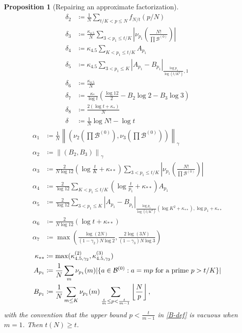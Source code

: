 \documentclass[12pt,a4paper,reqno]{amsart}
\numberwithin{equation}{section}
\theoremstyle{plain}
\newtheorem{proposition}[theorem]{Proposition}
\theoremstyle{definition}
\newcommand\tuple{{\mathcal B}}
\begin{document}
\begin{proposition}[Repairing an approximate factorization]
\begin{align}
\delta_2 &\coloneqq \frac{1}{N} \sum_{t/K < p \leq N} f_{N/t}(p/N) \label{delta2-def}  \\
\delta_3 &\coloneqq \frac{\kappa_{4.5}}{N}  \sum_{3 < p_1 \leq t/K} \left|\nu_{p_1}\left( \frac{N!}{\prod \tuple^{(0)}} \right)\right| \label{delta3-def}  \\
\delta_4 &\coloneqq \kappa_{4.5} \sum_{K < p_1 \leq t/K} A_{p_1} \label{delta4-def}  \\
\delta_5 &\coloneqq \kappa_{4.5} \sum_{3 < p_1 \leq K} |A_{p_1} - B_{p_1}|_{\frac{\log p_1}{\log(t/K^2)},1} \label{delta5-def}  \\
\delta_6 &\coloneqq \frac{\kappa_{4.5}}{N} \label{delta6-def}  \\
\delta_7 &\coloneqq \frac{\kappa_*}{\log t} \left( \frac{\log 12}{2} - B_2 \log 2 - B_3 \log 3\right)\label{delta7-def}  \\
\delta_8 &\coloneqq \frac{2(\log t + \kappa_*)}{N} \label{delta8-def}\\
\delta &\coloneqq \frac{1}{N} \log N! - \log t\label{delta-def}  
\end{align}
\begin{align}
\alpha_1 &\coloneqq \frac{1}{N} \left\| \left( \nu_{2}\left(\prod \tuple^{(0)}\right), \nu_{3}\left(\prod \tuple^{(0)}\right)\right) \right\|_\gamma \label{alpha1-def}  \\
\alpha_2 &\coloneqq \left\| (B_2, B_3) \right\|_\gamma \label{alpha2-def}  \\
\alpha_3 &\coloneqq \frac{2}{N\log 12} \left(\log \frac{t}{K} + \kappa_{**}\right) \sum_{3 < p_1 \leq t/K} \left|\nu_{p_1}\left( \frac{N!}{\prod \tuple^{(0)}} \right)\right| \label{alpha3-def}  \\
\alpha_4 &\coloneqq \frac{2}{\log 12} \sum_{K < p_1 \leq t/K} \left(\log \frac{t}{p_1} + \kappa_{**}\right) A_{p_1} \label{alpha4-def}  \\
\alpha_5 &\coloneqq \frac{2}{\log 12} \sum_{3 < p_1 \leq K} \left|A_{p_1} - B_{p_1}\right|_{\frac{\log p_1}{\log(t/K^2)} (\log K^2 + \kappa_{**}), \log p_1 + \kappa_{**}} \label{alpha5-def}  \\
\alpha_6 &\coloneqq \frac{2}{N\log 12} (\log t + \kappa_{**}) \label{alpha6-def}  \\
\alpha_7 &\coloneqq \max\left( \frac{\log(2N)}{(1-\gamma_2)N\log 2},  \frac{2\log(3N)}{(1-\gamma_3)N\log 3}\right)\label{alpha7-def}  
\end{align}
\begin{align}
\kappa_{**} &\coloneqq \max(\kappa^{(2)}_{4.5, \gamma_2}, \kappa^{(3)}_{4.5, \gamma_3}) \label{kappastar-def}  \\
A_{p_1} &\coloneqq \frac{1}{N} \sum_m \nu_{p_1}(m) | \{ a \in \tuple^{(0)}: a = mp \hbox{ for a prime } p > t/K \}| \label{A-def} \\
B_{p_1} &\coloneqq \frac{1}{N} \sum_{m \leq K} \nu_{p_1}(m) \sum_{\frac{t}{m} \leq p < \frac{t}{m-1}} \left \lfloor \frac{N}{p} \right\rfloor,\label{B-def} 
\end{align}
with the convention that the upper bound $p < \frac{t}{m-1}$ in \eqref{B-def} is vacuous when $m=1$.  Then $t(N) \geq t$.
\end{proposition}
\end{document}
